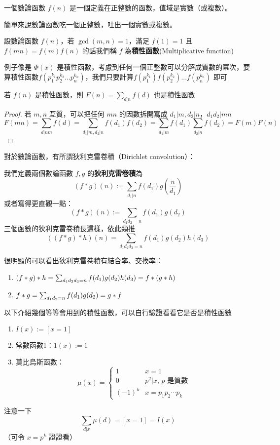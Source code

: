 \begin{definition}
一個數論函數 $f(n)$ 是一個定義在正整數的函數，值域是實數（或複數）。
\end{definition}
簡單來說數論函數吃一個正整數，吐出一個實數或複數。
\begin{definition}
設數論函數 $f(n)$，若 $\gcd(m,n)=1$，滿足 $f(1)=1$ 且 $f(mn)=f(m)f(n)$ 的話我們稱 $f$ 為\textbf{積性函數}(Multiplicative function)
\end{definition}
例子像是 $\Phi(x)$ 是積性函數，考慮到任何一個正整數可以分解成質數的冪次，要算積性函數$f(p_1^{k_1}p_2^{k_2}...p_n^{k_n})$，我們只要計算$f(p_1^{k_1})f(p_2^{k_2})...f(p_n^{k_n})$ 即可


\begin{theorem}
若 $f(n)$ 是積性函數，則 $F(n)=\sum_{d|n} f(d)$ 也是積性函數
\end{theorem}
\begin{proof}
若 $m,n$ 互質，可以把任何 $mn$ 的因數拆開寫成 $d_1|m,d_2|n$，$d_1d_2|mn$
$$F(mn)=\sum_{d|nm} f(d)=\sum_{d_1|m,d_2|n}f(d_1)f(d_2)=\sum_{d_1|m}f(d_1)\sum_{d_2|n}f(d_2)=F(m)F(n)$$
\end{proof}

對於數論函數，有所謂狄利克雷卷積（Dirichlet convolution）：
\begin{definition}
我們定義兩個數論函數 $f,g$ 的\textbf{狄利克雷卷積}為
$$(f*g)(n):=\sum_{d_1|n} f(d_1)g(\frac n {d_1})$$
或者寫得更直觀一點：
$$(f*g)(n):=\sum_{d_1d_2=n} f(d_1)g(d_2)$$
三個函數的狄利克雷卷積長這樣，依此類推
$$((f* g)* h)(n)=\sum_{d_1d_2d_3=n} f(d_1)g(d_2)h(d_3)$$
\end{definition}

很明顯的可以看出狄利克雷卷積有結合率、交換率：
\begin{enumerate}
\item $(f* g)* h \\ =\sum_{d_1d_2d_3=n} f(d_1)g(d_2)h(d_3)=f* (g*h)$
\item $f* g \\ =\sum_{d_1d_2=n} f(d_1)g(d_2)=g* f$
\end{enumerate}

以下介紹幾個等等會用到的積性函數，可以自行驗證看看它是否是積性函數

\begin{enumerate}
\item $I(x):=[x=1]$
\item 常數函數1：$1(x):=1$
\item 莫比烏斯函數：
$$\mu(x)=
\begin{cases}
1 & x=1\\
0 & p^{2}\vert x,\,p\textsf{ 是質數}\\
(-1)^k & x=p_1p_2\cdots p_k
\end{cases}
$$
\end{enumerate}
注意一下 $$\sum_{d\vert x} \mu(d)=[x=1]=I(x)$$（可令 $x=p^k$ 證證看）


